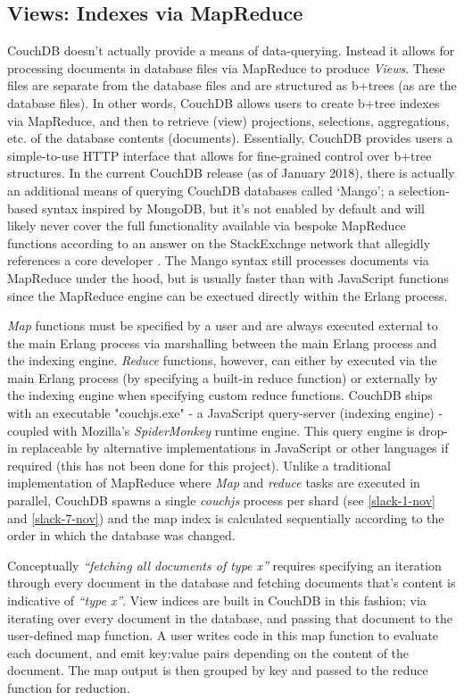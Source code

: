 \subsection{Views: Indexes via MapReduce}
CouchDB doesn't actually provide a means of data-querying. Instead it allows for processing documents in database files via MapReduce to produce \textit{Views}. These files are separate from the database files and are structured as b+trees (as are the database files). In other words, CouchDB allows users to create b+tree indexes via MapReduce, and then to retrieve (view) projections, selections, aggregations, etc. of the database contents (documents). Essentially, CouchDB provides users a simple-to-use HTTP interface that allows for fine-grained control over b+tree structures. In the current CouchDB release (as of January 2018), there is actually an additional means of querying CouchDB databases called `Mango'; a selection-based syntax inspired by MongoDB, but it's not enabled by default and will likely never cover the full functionality available via bespoke MapReduce functions according to an answer on the StackExchnge network that allegidly references a core developer \cite{Mango}. The Mango syntax still processes documents via MapReduce under the hood, but is usually faster than with JavaScript functions since the MapReduce engine can be exectued directly within the Erlang process.

\textit{Map} functions must be specified by a user and are always executed external to the main Erlang process via marshalling between the main Erlang process and the indexing engine. \textit{Reduce} functions, however, can either by executed via the main Erlang process (by specifying a built-in reduce function) or externally by the indexing engine when specifying custom reduce functions. CouchDB ships with an executable "couchjs.exe" - a JavaScript query-server (indexing engine) - coupled with Mozilla's \textit{SpiderMonkey} runtime engine. This query engine is drop-in replaceable by alternative implementations in JavaScript or other languages if required (this has not been done for this project). Unlike a traditional implementation of MapReduce where \textit{Map} and \textit{reduce} tasks are executed in parallel, CouchDB spawns a single \textit{couchjs} process per shard (see \ref{slack-1-nov} and \ref{slack-7-nov}) and the map index is calculated sequentially according to the order in which the database was changed.

Conceptually \textit{``fetching all documents of type x''} requires specifying an iteration through every document in the database and fetching documents that's content is indicative of \textit{``type x''}. View indices are built in CouchDB in this fashion; via iterating over every document in the database, and passing that document to the user-defined map function. A user writes code in this map function to evaluate each document, and emit key:value pairs depending on the content of the document. The map output is then grouped by key and passed to the reduce function for reduction.

